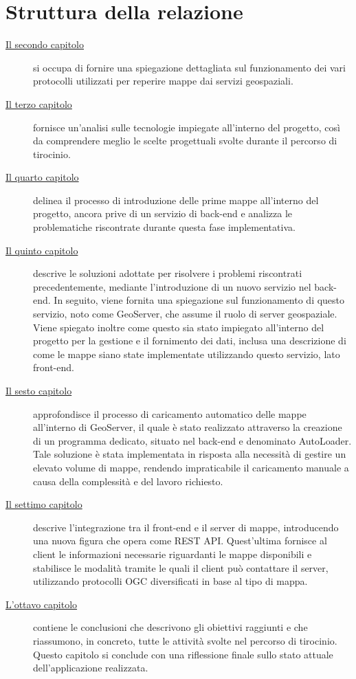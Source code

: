 \section{Struttura della relazione}

\begin{description}
    \item[{\hyperref[cap:chapter2]{Il secondo capitolo}}] si occupa di fornire una spiegazione dettagliata sul funzionamento dei vari protocolli utilizzati per reperire mappe dai servizi geospaziali.
    \item[{\hyperref[cap:chapter3]{Il terzo capitolo}}] fornisce un'analisi sulle tecnologie impiegate all'interno del progetto, così da comprendere meglio le scelte progettuali svolte durante il percorso di tirocinio.
    \item[{\hyperref[cap:chapter4]{Il quarto capitolo}}] delinea il processo di introduzione delle prime mappe all'interno del progetto, ancora prive di un servizio di back-end e analizza le problematiche riscontrate durante questa fase implementativa.
    \item[{\hyperref[cap:chapter5]{Il quinto capitolo}}] descrive le soluzioni adottate per risolvere i problemi riscontrati precedentemente, mediante l'introduzione di un nuovo servizio nel back-end. In seguito, viene fornita una spiegazione sul funzionamento di questo servizio, noto come GeoServer, che assume il ruolo di server geospaziale. Viene spiegato inoltre come questo sia stato impiegato all'interno del progetto per la gestione e il fornimento dei dati, inclusa una descrizione di come le mappe siano state implementate utilizzando questo servizio, lato front-end.
    \item[{\hyperref[cap:chapter6]{Il sesto capitolo}}] approfondisce il processo di caricamento automatico delle mappe all'interno di GeoServer, il quale è stato realizzato attraverso la creazione di un programma dedicato, situato nel back-end e denominato AutoLoader. Tale soluzione è stata implementata in risposta alla necessità di gestire un elevato volume di mappe, rendendo impraticabile il caricamento manuale a causa della complessità e del lavoro richiesto.
    \item[{\hyperref[cap:chapter7]{Il settimo capitolo}}] descrive l'integrazione tra il front-end e il server di mappe, introducendo una nuova figura che opera come REST API. Quest'ultima fornisce al client le informazioni necessarie riguardanti le mappe disponibili e stabilisce le modalità tramite le quali il client può contattare il server, utilizzando protocolli OGC diversificati in base al tipo di mappa. 
    \item[{\hyperref[cap:chapter8]{L'ottavo capitolo}}]  contiene le conclusioni che descrivono gli obiettivi raggiunti e che riassumono, in concreto, tutte le attività svolte nel percorso di tirocinio. Questo capitolo si conclude con una riflessione finale sullo stato attuale dell'applicazione realizzata.
\end{description}